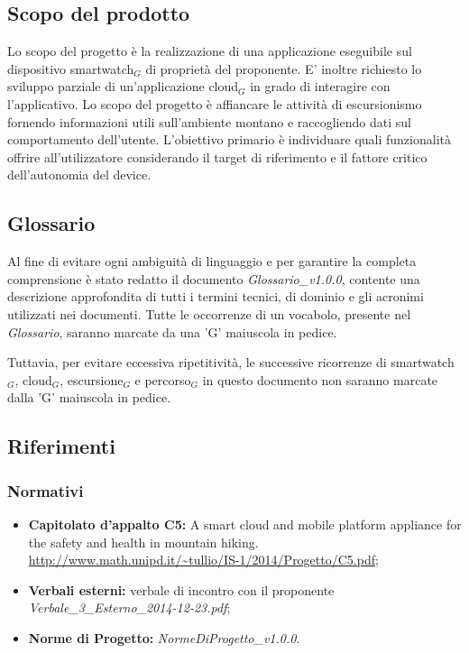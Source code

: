 \subsection{Scopo del prodotto}
Lo scopo del progetto è la realizzazione di una applicazione eseguibile sul dispositivo smartwatch$_{G}$ di proprietà del proponente. E’ inoltre richiesto lo sviluppo parziale di un’applicazione cloud$_{G}$ in grado di interagire con l’applicativo. Lo scopo del progetto è affiancare le attività di escursionismo fornendo informazioni utili sull’ambiente montano e raccogliendo dati sul comportamento dell’utente. L’obiettivo primario è individuare quali funzionalità offrire all’utilizzatore considerando il target di riferimento e il fattore critico dell’autonomia del device.

\subsection{Glossario}
Al fine di evitare ogni ambiguità di linguaggio e per garantire la completa comprensione è stato redatto il documento \textit{Glossario\_v1.0.0}, contente una descrizione approfondita di tutti i termini tecnici, di dominio e gli acronimi utilizzati nei documenti. Tutte le occorrenze di un vocabolo, presente nel \textit{Glossario}, saranno marcate da una 'G' maiuscola in pedice.

Tuttavia, per evitare eccessiva ripetitività, le successive ricorrenze di smartwatch$_{G}$, cloud$_{G}$, escursione$_{G}$ e percorso$_{G}$ in questo documento non saranno marcate dalla 'G' maiuscola in pedice.


\subsection{Riferimenti}
\subsubsection{Normativi}
\begin{itemize}
\item \textbf{Capitolato d'appalto C5:} \CAPITOLATO{} A smart cloud and mobile platform appliance for the safety and health in mountain hiking. \\
\url{http://www.math.unipd.it/~tullio/IS-1/2014/Progetto/C5.pdf};
\item \textbf{Verbali esterni:} verbale di incontro con il proponente {\itshape Verbale\_3\_Esterno\_2014-12-23.pdf}; 
\item \textbf{Norme di Progetto:} {\itshape NormeDiProgetto\_v1.0.0}.
\end{itemize} 

